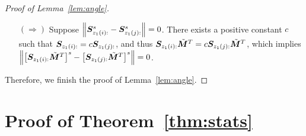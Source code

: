 \documentclass[lettersize,onecolumn,journal]{IEEEtran}
\theoremstyle{definition}
\theoremstyle{definition}
\newcommand{\of}[1]{\left(#1\right)}
\newcommand{\off}[1]{\left[#1\right]}
\begin{document}
\begin{proof}[Proof of Lemma~\ref{lem:angle}]
\begin{enumerate}
\item[$(\Rightarrow)$] Suppose $ \left\lVert \bm S_{z_1(i):}^s - \bm S_{z_1(j):}^s \right\rVert = 0 $. There exists a positive constant $c$ such that $\bm S_{z_1(i):} = c \bm S_{z_1(j):}$, and thus $\bm S_{z_1(i):} \tilde {\bm M}^T = c \bm S_{z_1(j):} \tilde {\bm M}^T$, which implies $\left\lVert\left[\bm S_{z_1(i):} \tilde {\bm M}^T\right]^s- \left[\bm S_{z_1(j):} \tilde {\bm M}^T\right]^s\right\rVert=0$.
\end{enumerate}
Therefore, we finish the proof of Lemma~\ref{lem:angle}.
\end{proof}



\section*{Proof of Theorem~\ref{thm:stats}}
\end{document}
